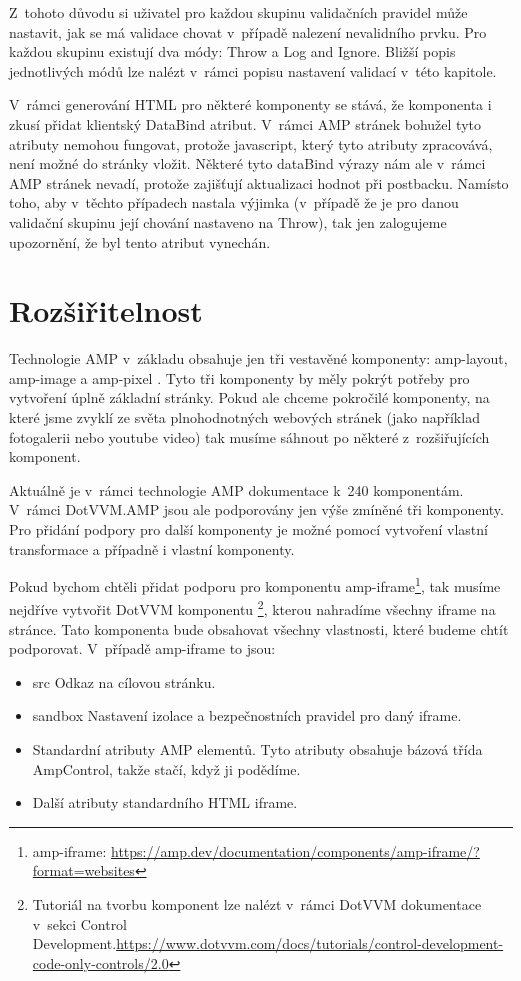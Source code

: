 Z~tohoto důvodu si uživatel pro každou skupinu validačních pravidel může nastavit, jak se má validace chovat v~případě nalezení nevalidního prvku. Pro každou skupinu existují dva módy: Throw a Log and Ignore. Bližší popis jednotlivých módů lze nalézt v~rámci popisu nastavení validací v~této kapitole.

V~rámci generování HTML pro některé komponenty se stává, že komponenta i zkusí přidat klientský DataBind atribut. V~rámci AMP stránek bohužel tyto atributy nemohou fungovat, protože javascript, který tyto atributy zpracovává, není možné do stránky vložit. Některé tyto dataBind výrazy nám ale v~rámci AMP stránek nevadí, protože zajišťují aktualizaci hodnot při postbacku. Namísto toho, aby v~těchto případech nastala výjimka (v~případě že je pro danou validační skupinu její chování nastaveno na Throw), tak jen zalogujeme upozornění, že byl tento atribut vynechán.

\section{Rozšiřitelnost}
Technologie AMP v~základu obsahuje jen tři vestavěné komponenty: amp-layout, amp-image a amp-pixel \cite[Ch.\ 3, p.\ 160]{VzhuruDoAMP}. Tyto tři komponenty by měly pokrýt potřeby pro vytvoření úplně základní stránky. Pokud ale chceme pokročilé komponenty, na které jsme zvyklí ze světa plnohodnotných webových stránek (jako například fotogalerii nebo youtube video) tak musíme sáhnout po některé z~rozšiřujících komponent.

Aktuálně je v~rámci technologie AMP dokumentace k~240 komponentám. V~rámci DotVVM.AMP jsou ale podporovány jen výše zmíněné tři komponenty. Pro přidání podpory pro další komponenty je možné pomocí vytvoření vlastní transformace a případně i vlastní komponenty.

Pokud bychom chtěli přidat podporu pro komponentu amp-iframe\footnote{amp-iframe: \url{https://amp.dev/documentation/components/amp-iframe/?format=websites}}, tak musíme nejdříve vytvořit DotVVM komponentu \footnote{Tutoriál na tvorbu komponent lze nalézt v~rámci DotVVM dokumentace v~sekci Control Development.\newline \url{https://www.dotvvm.com/docs/tutorials/control-development-code-only-controls/2.0}}, kterou nahradíme všechny iframe na stránce. Tato komponenta bude obsahovat všechny vlastnosti, které budeme chtít podporovat. V~případě amp-iframe to jsou:
\begin{itemize}
    \item src\newline
    Odkaz na cílovou stránku.
    \item sandbox\newline
    Nastavení izolace a bezpečnostních pravidel pro daný iframe.
    \item Standardní atributy AMP elementů.\newline
    Tyto atributy obsahuje bázová třída AmpControl, takže stačí, když ji podědíme.
    \item Další atributy standardního HTML iframe.
\end{itemize}

